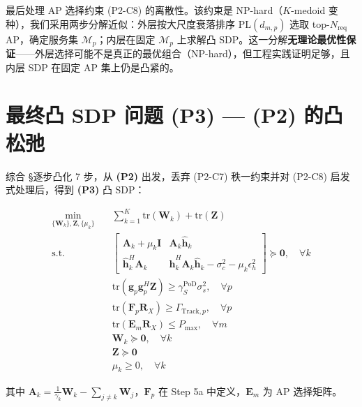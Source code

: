 \documentclass[12pt,a4paper]{article}
\newcommand{\vect}[1]{\mathbf{#1}}
\newcommand{\mat}[1]{\mathbf{#1}}
\newcommand{\tr}{\text{tr}}
\begin{document}
最后处理 AP 选择约束 (P2-C8) 的离散性。该约束是 NP-hard（$K$-medoid 变种），我们采用两步分解近似：外层按大尺度衰落排序 $\text{PL}(d_{m,p})$ 选取 top-$N_{\text{req}}$ AP，确定服务集 $\mathcal{M}_p$；内层在固定 $\mathcal{M}_p$ 上求解凸 SDP。这一分解\textbf{无理论最优性保证}——外层选择可能不是真正的最优组合（NP-hard），但工程实践证明足够，且内层 SDP 在固定 AP 集上仍是凸紧的。

\section{最终凸 SDP 问题 (P3) — (P2) 的凸松弛}

综合 §逐步凸化 7 步，从 \textbf{(P2)} 出发，丢弃 (P2-C7) 秩一约束并对 (P2-C8) 启发式处理后，得到 \textbf{(P3)} 凸 SDP：

\begin{align}
\min_{\{\mat{W}_k\}, \mat{Z}, \{\mu_k\}} \quad 
& \sum_{k=1}^K \tr(\mat{W}_k) + \tr(\mat{Z}) \tag{P3} \\
\text{s.t.} \quad 
& \begin{bmatrix} \mat{A}_k + \mu_k \mat{I} & \mat{A}_k \hat{\vect{h}}_k \\[1.5ex] \hat{\vect{h}}_k^H \mat{A}_k & \hat{\vect{h}}_k^H \mat{A}_k \hat{\vect{h}}_k - \sigma_c^2 - \mu_k \epsilon_h^2 \end{bmatrix} \succeq \mat{0}, \quad \forall k \tag{P3-C1} \label{eq:p3c1} \\
& \tr(\vect{g}_p \vect{g}_p^H \mat{Z}) \geq \gamma_S^{\text{PoD}} \sigma_s^2, \quad \forall p \tag{P3-C2} \label{eq:p3c2} \\
& \tr(\mat{F}_p \mat{R}_X) \geq \Gamma_{\text{Track},p}, \quad \forall p \tag{P3-C3} \label{eq:p3c3} \\
& \tr(\mat{E}_m \mat{R}_X) \leq P_{\max}, \quad \forall m \tag{P3-C4} \label{eq:p3c4} \\
& \mat{W}_k \succeq \mat{0}, \quad \forall k \tag{P3-C5} \label{eq:p3c5} \\
& \mat{Z} \succeq \mat{0} \tag{P3-C6} \label{eq:p3c6} \\
& \mu_k \geq 0, \quad \forall k \tag{P3-C7} \label{eq:p3c7}
\end{align}

其中 $\mat{A}_k = \frac{1}{\gamma_k} \mat{W}_k - \sum_{j \neq k} \mat{W}_j$，$\mat{F}_p$ 在 Step 5a 中定义，$\mat{E}_m$ 为 AP 选择矩阵。
\end{document}
